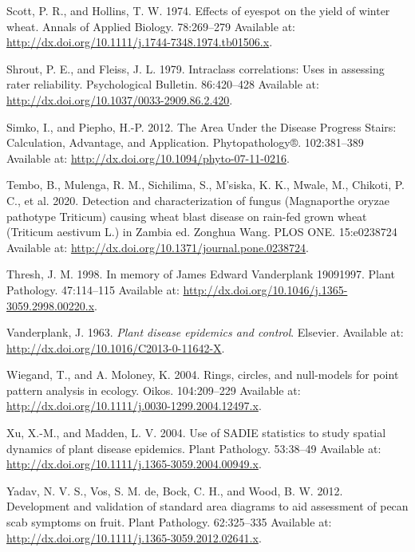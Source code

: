 \documentclass[
  letterpaper,
]{book}
\newlength{\cslhangindent}
\newlength{\cslentryspacingunit} %
\newenvironment{CSLReferences}[2] %
 {%
  \setlength{\parindent}{0pt}
  \ifodd #1
  \let\oldpar\par
  \def\par{\hangindent=\cslhangindent\oldpar}
  \fi
  \setlength{\parskip}{#2\cslentryspacingunit}
 }%
 {}
\begin{document}
\begin{CSLReferences}{0}{0}
\leavevmode{}%
Scott, P. R., and Hollins, T. W. 1974. Effects of eyespot on the yield
of winter wheat. Annals of Applied Biology. 78:269--279 Available at:
\url{http://dx.doi.org/10.1111/j.1744-7348.1974.tb01506.x}.

\leavevmode{}%
Shrout, P. E., and Fleiss, J. L. 1979. Intraclass correlations: Uses in
assessing rater reliability. Psychological Bulletin. 86:420--428
Available at: \url{http://dx.doi.org/10.1037/0033-2909.86.2.420}.

\leavevmode{}%
Simko, I., and Piepho, H.-P. 2012. The Area Under the Disease Progress
Stairs: Calculation, Advantage, and Application. Phytopathology®.
102:381--389 Available at:
\url{http://dx.doi.org/10.1094/phyto-07-11-0216}.

\leavevmode{}%
Tembo, B., Mulenga, R. M., Sichilima, S., M'siska, K. K., Mwale, M.,
Chikoti, P. C., et al. 2020. Detection and characterization of fungus
(Magnaporthe oryzae pathotype Triticum) causing wheat blast disease on
rain-fed grown wheat (Triticum aestivum L.) in Zambia ed. Zonghua Wang.
PLOS ONE. 15:e0238724 Available at:
\url{http://dx.doi.org/10.1371/journal.pone.0238724}.

\leavevmode{}%
Thresh, J. M. 1998. In memory of James Edward Vanderplank
1909{\textendash}1997. Plant Pathology. 47:114--115 Available at:
\url{http://dx.doi.org/10.1046/j.1365-3059.2998.00220.x}.

\leavevmode{}%
Vanderplank, J. 1963. \emph{Plant disease epidemics and control}.
Elsevier. Available at: \url{http://dx.doi.org/10.1016/C2013-0-11642-X}.

\leavevmode{}%
Wiegand, T., and A. Moloney, K. 2004. Rings, circles, and null-models
for point pattern analysis in ecology. Oikos. 104:209--229 Available at:
\url{http://dx.doi.org/10.1111/j.0030-1299.2004.12497.x}.

\leavevmode{}%
Xu, X.-M., and Madden, L. V. 2004. Use of {SADIE} statistics to study
spatial dynamics of plant disease epidemics. Plant Pathology. 53:38--49
Available at: \url{http://dx.doi.org/10.1111/j.1365-3059.2004.00949.x}.

\leavevmode{}%
Yadav, N. V. S., Vos, S. M. de, Bock, C. H., and Wood, B. W. 2012.
Development and validation of standard area diagrams to aid assessment
of pecan scab symptoms on fruit. Plant Pathology. 62:325--335 Available
at: \url{http://dx.doi.org/10.1111/j.1365-3059.2012.02641.x}.


\end{CSLReferences}
\end{document}
